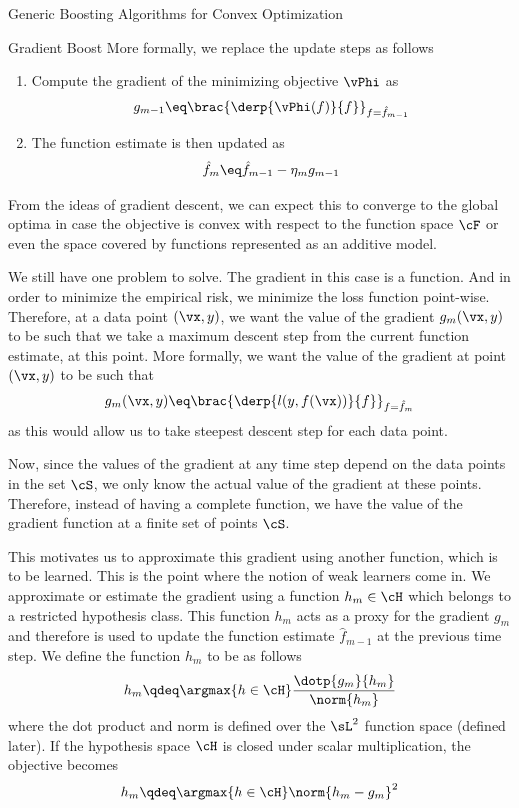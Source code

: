 \documentclass{article}
\begin{document}
\begin{psection}{Generic Boosting Algorithms for Convex Optimization}
\begin{psubsection}{Gradient Boost}
		More formally, we replace the update steps as follows
		\begin{enumerate}
			\item Compute the gradient of the minimizing objective $\vPhi$ as
				\begin{align*}
					g_{m - 1} \eq \brac{\derp{\vPhi(f)}{f}}_{f = \hat{f}_{m - 1}}
				\end{align*}
			\item The function estimate is then updated as
				\begin{align*}
					\hat{f}_m \eq \hat{f}_{m - 1} - \eta_m g_{m - 1}
				\end{align*}
		\end{enumerate}

		From the ideas of gradient descent, we can expect this to converge to the global optima in case the objective is convex with respect to the function space $\cF$ or even the space covered by functions represented as an additive model.

		We still have one problem to solve. The gradient in this case is a function. And in order to minimize the empirical risk, we minimize the loss function point-wise. Therefore, at a data point $(\vx, y)$, we want the value of the gradient $g_m(\vx, y)$ to be such that we take a maximum descent step from the current function estimate, at this point. More formally, we want the value of the gradient at point $(\vx, y)$ to be such that
		\begin{align*}
			g_m(\vx, y) \eq \brac{\derp{l(y, f(\vx))}{f}}_{f = \hat{f}_{m}}
		\end{align*}
		as this would allow us to take steepest descent step for each data point.

		Now, since the values of the gradient at any time step depend on the data points in the set $\cS$, we only know the actual value of the gradient at these points. Therefore, instead of having a complete function, we have the value of the gradient function at a finite set of points $\cS$.

		This motivates us to approximate this gradient using another function, which is to be learned. This is the point where the notion of weak learners come in. We approximate or estimate the gradient using a function $h_m \in \cH$ which belongs to a restricted hypothesis class. This function $h_m$ acts as a proxy for the gradient $g_m$ and therefore is used to update the function estimate $\hat{f}_{m - 1}$ at the previous time step. We define the function $h_m$ to be as follows
		\begin{equation}
			h_m \qdeq \argmax{h \in \cH} \frac{\dotp{g_m}{h_m}}{\norm{h_m}}
			\label{eq:weak-obj}
		\end{equation}
		where the dot product and norm is defined over the $\sL^2$ function space (defined later). If the hypothesis space $\cH$ is closed under scalar multiplication, the objective becomes \citep{cvx-boosting}
		\begin{equation}
			h_m \qdeq \argmax{h \in \cH} \norm{h_m - g_m}^2
			\label{eq:weak-obj-closed}
		\end{equation}


\end{psubsection}
\end{psection}
\end{document}
